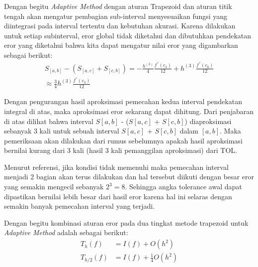 \documentclass[journal,12pt,onecolumn,a4paper]{IEEEtran}
\begin{document}
Dengan begitu \emph{Adaptive Method} dengan aturan Trapezoid dan aturan titik tengah akan mengatur pembagian sub-interval menyesuaikan fungsi yang diintegrasi pada interval tertentu dan kebutuhan akurasi. Karena dilakukan untuk setiap subinterval, eror global tidak diketahui dan dibutuhkan pendekatan eror yang diketahui bahwa kita dapat mengatur nilai eror yang digambarkan sebagai berikut:
\begin{equation*}
	\begin{split}
		S_{[a,b]} - (S_{[a,c]} + S_{[c,b]})  = -\frac{h^{(3)}}{4}\frac{f^{''}(c_3)}{12} + h^{(3)}\frac{f^{''}(c_0)}{12} \\
		\approx \frac{3}{4} h^{(3)}\frac{f^{''}(c_3)}{12}
	\end{split}
\end{equation*}

Dengan pengurangan hasil aproksimasi pemecahan kedua interval pendekatan integral di atas, maka aproksimasi eror sekarang dapat dihitung. Dari penjabaran di atas dilihat bahwa interval \(S[a,b]\) - (\(S[a,c]\) + \(S[c,b]\)) diaproksimasi sebanyak 3 kali untuk sebuah interval \(S[a,c]\) + \(S[c,b]\) dalam \([a,b]\). Maka pemeriksaan akan dilakukan dari rumus sebelumnya apakah hasil aproksimasi bernilai kurang dari 3 kali (hasil 3 kali pemanggilan aproksimasi) dari TOL.

Menurut referensi, jika kondisi tidak memenuhi maka pemecahan interval menjadi 2 bagian akan terus dilakukan dan hal tersebut diikuti dengan besar eror yang semakin mengecil sebanyak \(2^3 = 8\). Sehingga angka tolerance awal dapat dipastikan bernilai lebih besar dari hasil eror karena hal ini selaras dengan semakin banyak pemecahan interval yang terjadi.

Dengan begitu kombinasi aturan eror pada dua tingkat metode trapezoid untuk \emph{Adaptive Method} adalah sebagai berikut:
\begin{equation*}
	\begin{split}
		T_{h}(f) & = I(f) + O(h^2) \\
		T_{h/2}(f) & = I(f) + \frac{1}{4}O(h^2)
	\end{split}
\end{equation*}
\end{document}
